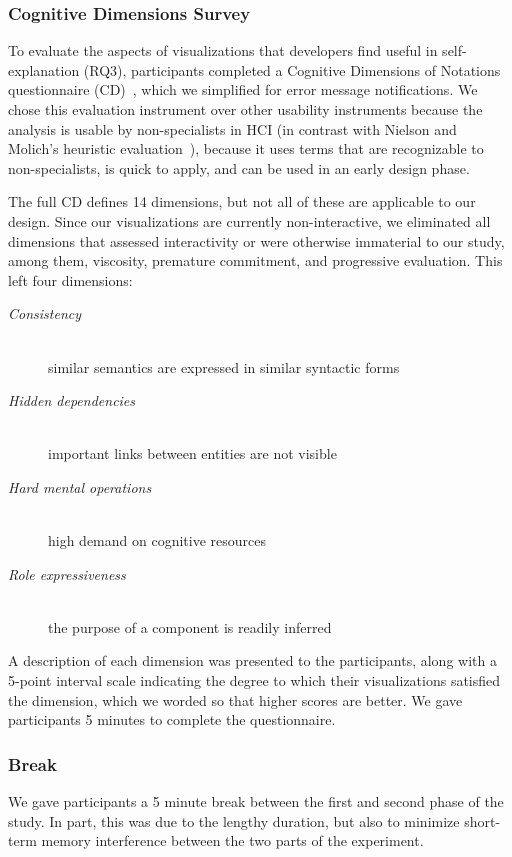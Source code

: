 \documentclass[conference]{IEEEtran}
\begin{document}
\subsubsection{Cognitive Dimensions Survey}
\label{subsec:cogdim}

To evaluate the aspects of visualizations that developers find useful in self-explanation (RQ3), participants completed a Cognitive Dimensions of Notations questionnaire (CD)~\cite{Green1996}, which we simplified for error message notifications. We chose this evaluation instrument over other usability instruments because the analysis is usable by non-specialists in HCI (in contrast with Nielson and Molich's heuristic evaluation~\cite{Nielsen1990}), because it uses terms that are recognizable to non-specialists, is quick to apply, and can be used in an early design phase.

The full CD defines 14 dimensions, but not all of these are applicable to our design. Since our visualizations are currently non-interactive, we eliminated all dimensions that assessed interactivity or were otherwise immaterial to our study, among them, viscosity, premature commitment, and progressive evaluation. This left four dimensions:

\begin{description}
\item[\textit{Consistency}]\hfill\\ similar semantics are expressed in similar syntactic forms
\item[\textit{Hidden dependencies}]\hfill\\ important links between entities are not visible
\item[\textit{Hard mental operations}]\hfill\\ high demand on cognitive resources
\item[\textit{Role expressiveness}]\hfill\\ the purpose of a component is readily inferred
\end{description}

A description of each dimension was presented to the participants, along with a 5-point interval scale indicating the degree to which their visualizations satisfied the dimension, which we worded so that higher scores are better. We gave participants 5 minutes to complete the questionnaire.

\subsubsection{Break} We gave participants a 5 minute break between the first and second phase of the study. In part, this was due to the lengthy duration, but also to minimize short-term memory interference between the two parts of the experiment.
\end{document}
